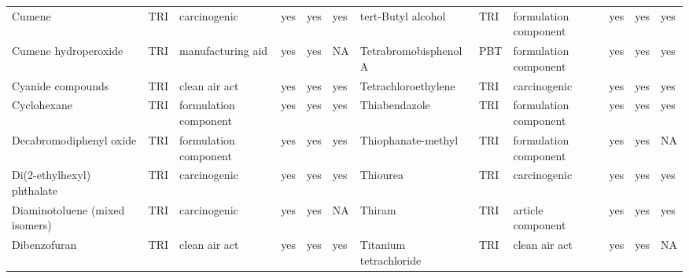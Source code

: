 \begin{table}[H]
{\begin{tabular}{llllllllllll}
            Cumene                                                                     & TRI            & carcinogenic          & yes    & yes     & yes  & tert-Butyl alcohol                                                                                                 & TRI            & formulation component & yes & yes & yes\\
            Cumene hydroperoxide                                                       & TRI            & manufacturing aid     & yes    & yes     & NA   & Tetrabromobisphenol A                                                                                              & PBT            & formulation component & yes & yes & yes\\
            Cyanide compounds                                                          & TRI            & clean air act         & yes    & yes     & yes  & Tetrachloroethylene                                                                                                & TRI            & carcinogenic & yes & yes & yes\\
            Cyclohexane                                                                & TRI            & formulation component & yes    & yes     & yes  & Thiabendazole                                                                                                      & TRI            & formulation component & yes & yes & yes\\
            Decabromodiphenyl oxide                                                    & TRI            & formulation component & yes    & yes     & yes  & Thiophanate-methyl & TRI & formulation component & yes & yes & NA\\
            Di(2-ethylhexyl) phthalate                                                 & TRI            & carcinogenic          & yes    & yes     & yes  & Thiourea                                                                                                           & TRI            & carcinogenic & yes & yes & yes\\
            Diaminotoluene (mixed isomers)                                             & TRI            & carcinogenic          & yes    & yes     & NA   & Thiram                                                                                                             & TRI            & article component & yes & yes & yes\\
            Dibenzofuran                                                               & TRI            & clean air act         & yes    & yes     & yes  & Titanium tetrachloride                                                                                             & TRI            & clean air act & yes & yes & NA\\

\end{tabular}}
\end{table}
